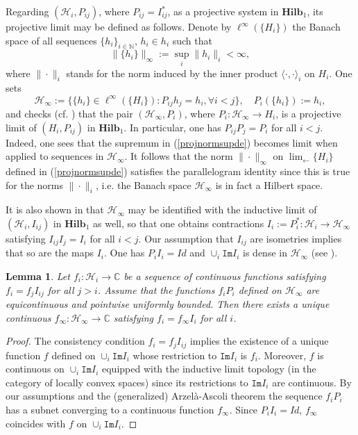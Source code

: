 \documentclass[11pt,reqno]{amsart}
\numberwithin{equation}{section}
\newtheorem{lemma}[theorem]{Lemma}
\theoremstyle{remark}
\theoremstyle{rmdefinition}
\begin{document}
Regarding $(\mathcal{H}_i,P_{ij})$, where $P_{ij}=I^*_{ij}$, as a projective system in $\mathbf{Hilb}_1$, its projective limit may be defined as follows. Denote by $\ell^{\infty}(\{H_{i}\})$ the Banach space 
of all sequences $\{h_{i}\}_{i \in \mathbb{N}}$, $h_i \in h_i$ such that
\begin{equation}\label{projnormsupde}
	\|\{h_{i}\}\|_{\infty}:=\sup_{i}\| h_i\|_{i}< \infty,
\end{equation}
where $\|\cdot \|_i$ stands for the norm induced by the inner product $\langle \cdot,\cdot \rangle_i$ on $H_{i}$. One sets
\begin{equation}\label{projlimband}
	\mathcal{H}_{\infty}:=
	\{\{h_i\} \in \ell^{\infty}(\{H_{i}\}): P_{ij}h_j=h_i, \forall i<j\}, \quad P_i(\{h_i\}):=h_i,
\end{equation}
and checks (cf. \cite[Theorem 2.3]{Gr}) that the pair $(\mathcal{H}_{\infty}, P_i)$,
where  $P_{i}:\mathcal{H}_{\infty} \rightarrow  H_{i}$,  is a projective limit of 
$(H_{i},P_{ij})$ in $\mathbf{Hilb}_1$. In particular, one has
$P_{ij}P_j=P_i$ for all $i<j$. Indeed, one sees  that the supremum in (\ref{projnormsupde}) becomes limit when applied to sequences in $\mathcal{H}_{\infty}$. It follows that the norm $\| \cdot \|_{\infty }$ on $\lim_{\leftarrow}\{H_i\}$ defined in  (\ref{projnormsupde}) satisfies the parallelogram identity since this is true for the norms $\|\cdot \|_i$, i.e. the Banach space $\mathcal{H}_{\infty}$ is in fact a Hilbert space.

It is also shown in \cite[Section 2]{Gr} that $\mathcal{H}_{\infty}$ may be identified with the inductive limit of $(\mathcal{H}_i,I_{ij})$ in $\mathbf{Hilb}_1$ as well, so that one obtains contractions $I_i:=P^{*}_{i}: \mathcal{H}_i \rightarrow \mathcal{H}_{\infty}$ satisfying $I_{ij}I_j=I_i$ for all $i<j$. Our assumption that $I_{ij}$ are isometries implies that so are the maps $I_i$. One has $P_i I_i=Id$ and $\cup_{i}\mathtt{Im}I_i$ is dense in $\mathcal{H}_{\infty}$ (see \cite[Section 4.2]{C}).

\begin{lemma}\label{leonequicof}
Let $f_i: \mathcal{H}_i \rightarrow \mathbb{C}$ be a sequence of continuous functions satisfying $f_i=f_jI_{ij}$ for all $j>i$. Assume  that the functions $f_iP_i$ defined on $\mathcal{H}_{\infty}$ are equicontinuous and pointwise uniformly bounded. Then there exists a unique continuous $f_{\infty}: \mathcal{H}_{\infty} \rightarrow \mathbb{C}$ satisfying
$f_i=f_{\infty}I_{i}$ for all $i$.
\end{lemma}
\begin{proof}
The consistency condition $f_i=f_jI_{ij}$ implies the existence of a unique function $f$ defined on $\cup_{i}\mathtt{Im}I_i$ whose restriction to $\mathtt{Im}I_i$ is $f_i$. Moreover, $f$ is continuous on $\cup_{i}\mathtt{Im}I_i$ equipped with the inductive limit topology (in the category of locally convex spaces) since its restrictions to $\mathtt{Im}I_i$ are continuous.
By our assumptions and the (generalized) Arzel\`a-Ascoli theorem the sequence $f_iP_i$ has a subnet converging to a continuous function $f_{\infty}$. Since $P_iI_i=Id$, $f_{\infty}$ coincides with $f$ on $\cup_{i}\mathtt{Im}I_i$.
\end{proof}
\end{document}
